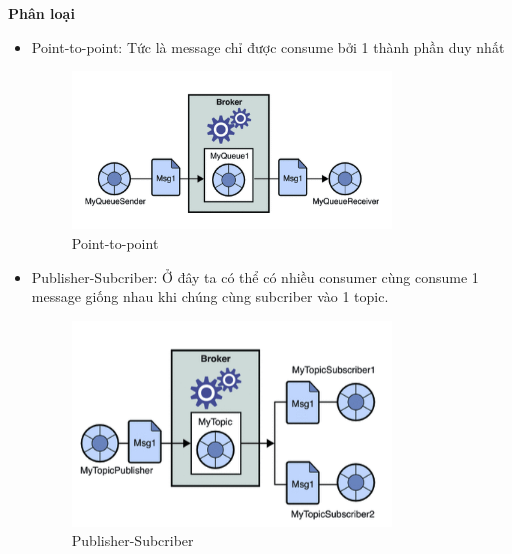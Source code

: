             \textbf{Phân loại}
            
            \begin{itemize}
                \item Point-to-point: Tức là message chỉ được consume bởi 1 thành phần duy nhất
                
                \begin{figure}[H]   			
                	\includegraphics[width=0.8\textwidth]{Images/PTP.png}
	        		\centering
	        		\linebreak
	        		\caption{Point-to-point}
                \end{figure}
                
                \item Publisher-Subcriber: Ở đây ta có thể có nhiều consumer cùng consume 1 message giống nhau khi chúng cùng subcriber vào 1 topic.
                
                \begin{figure}[H]   			\includegraphics[width=0.8\textwidth]{Images/PS.png}
        		\centering
        		\linebreak
        		\caption{Publisher-Subcriber}
                \end{figure}
                
            \end{itemize}
            
